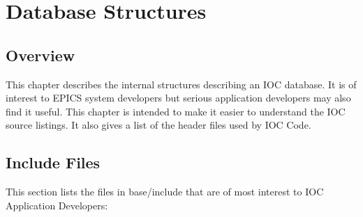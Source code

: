 \chapter{Database Structures}

\section{Overview}

This chapter describes the internal structures describing an IOC database. It is of interest to EPICS system developers but 
serious application developers may also find it useful. This chapter is intended to make it easier to understand the IOC 
source listings. It also gives a list of the header files used by IOC Code.

\section{Include Files}

This section lists the files in base/include that are of most interest to IOC Application Developers:

